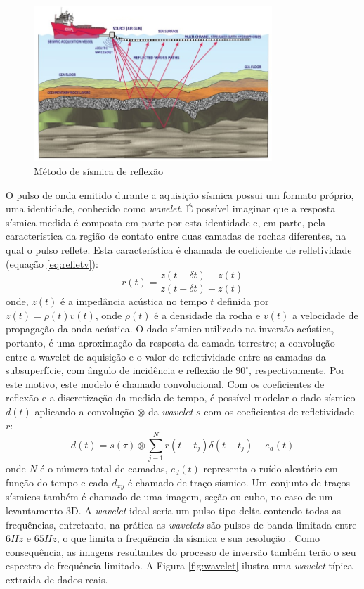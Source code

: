 \begin{figure}[ht!]
\begin{center}
  \includegraphics[width=0.8\textwidth]{fig/seismic_survey_2}
  \caption{Método de sísmica de reflexão \citep{figsismica}}
  \label{fig:1sismica}
\end{center}
\end{figure}

O pulso de onda emitido durante a aquisição sísmica possui um formato próprio, uma identidade, 
conhecido como \textit{wavelet}. É possível imaginar que a resposta sísmica medida
é composta em parte por esta identidade e, em parte, pela característica da região de contato
entre duas camadas de rochas diferentes, na qual o pulso reflete.
Esta característica é chamada de coeficiente de refletividade (equação \ref{eq:refletv}):
\begin{equation}
r(t) = \frac{z(t+\delta t)-z(t)}{z(t+\delta t)+z(t)}
\label{eq:refletv}
\end{equation}
onde, $z(t)$ é a impedância acústica no tempo $t$ definida por
$z(t)=\rho(t)v(t)$, onde $\rho(t)$ é a densidade da rocha e $v(t)$ a
velocidade de propagação da onda acústica.
O dado sísmico utilizado na inversão acústica, portanto,
é uma aproximação da resposta da camada terrestre;
a convolução entre a wavelet de aquisição e o valor de refletividade entre as
camadas da subsuperfície, com ângulo de incidência e reflexão de $90^\circ$,
respectivamente. Por este motivo, este modelo é chamado convolucional.
Com os coeficientes de reflexão e a discretização da medida de tempo, é possível
modelar o dado sísmico $d(t)$ aplicando a convolução $\otimes$
da \textit{wavelet} $s$ com os coeficientes de refletividade $r$:
\begin{equation}
d(t) = s(\tau) \otimes \sum_{j-1}^{N}{r(t- t_j) \delta(t - t_j) + e_d(t)}
\end{equation}
onde $N$ é o número total de camadas, $e_d(t)$ representa o ruído aleatório em função do tempo
e cada $d_{xy}$ é chamado de traço sísmico. Um conjunto de traços
sísmicos também é chamado de uma imagem, seção ou cubo, no caso de um
levantamento 3D. A \textit{wavelet} ideal seria um pulso tipo delta contendo
todas as frequências, entretanto, na prática as
\textit{wavelets} são pulsos de banda limitada entre $6Hz$ e $65Hz$, o que
limita a frequência da sísmica e sua resolução \citep[p. 11]{sen_livro}.
Como consequência, as imagens resultantes do processo de inversão também terão
o seu espectro de frequência limitado.
A Figura \ref{fig:wavelet} ilustra uma \textit{wavelet} típica extraída de dados
reais.

